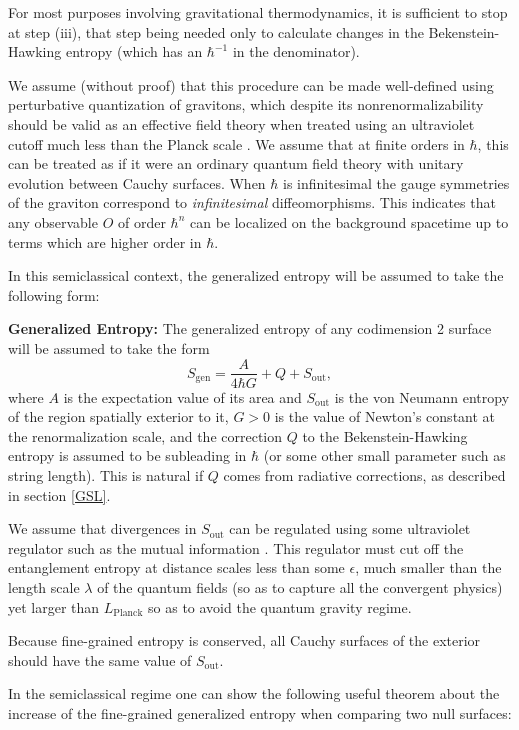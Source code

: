 \documentclass{article}
\begin{document}
For most purposes involving gravitational thermodynamics, it is sufficient to stop at step (iii), that step being needed only to calculate changes in the Bekenstein-Hawking entropy (which has an $\hbar^{-1}$ in the denominator).

We assume (without proof) that this procedure can be made well-defined using perturbative quantization of gravitons, which despite its nonrenormalizability should be valid as an effective field theory when treated using an ultraviolet cutoff much less than the Planck scale \cite{burgess}.  We assume that at finite orders in $\hbar$, this can be treated as if it were an ordinary quantum field theory with unitary evolution between Cauchy surfaces.  When $\hbar$ is infinitesimal the gauge symmetries of the graviton correspond to \emph{infinitesimal} diffeomorphisms.  This indicates that any observable $O$ of order $\hbar^n$ can be localized on the background spacetime up to terms which are higher order in $\hbar$.

In this semiclassical context, the generalized entropy will be assumed to take the following form:

\textbf{Generalized Entropy:} The generalized entropy of any codimension 2 surface will be assumed to take the form
\begin{equation}
S_\mathrm{gen} = \frac{A}{4 \hbar G} + Q + S_\mathrm{out},
\end{equation}
where $A$ is the expectation value of its area and $S_\mathrm{out}$ is the von Neumann entropy of the region spatially exterior to it, $G > 0$ is the value of Newton's constant at the renormalization scale, and the correction $Q$ to the Bekenstein-Hawking entropy is assumed to be subleading in $\hbar$ (or some other small parameter such as string length).  This is natural if $Q$ comes from radiative corrections, as described in section \ref{GSL}.

We assume that divergences in $S_\mathrm{out}$ can be regulated using some ultraviolet regulator such as the mutual information \cite{Imono}.  This regulator must cut off the entanglement entropy at distance scales less than some $\epsilon$, much smaller than the length scale $\lambda$ of the quantum fields (so as to capture all the convergent physics) yet larger than $L_\mathrm{Planck}$ so as to avoid the quantum gravity regime.

Because fine-grained entropy is conserved, all Cauchy surfaces of the exterior should have the same value of $S_\mathrm{out}$.

In the semiclassical regime one can show the following useful theorem about the increase of the fine-grained generalized entropy when comparing two null surfaces:
\end{document}
